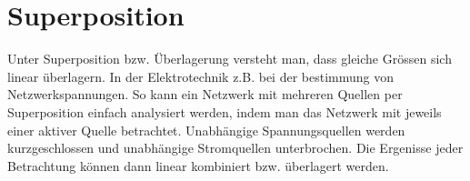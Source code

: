



\section{Superposition}
\label{sec:superpos}
Unter Superposition bzw. Überlagerung versteht man, dass gleiche Grössen sich linear überlagern.
In der Elektrotechnik z.B. bei der bestimmung von Netzwerkspannungen. 
So kann ein Netzwerk mit mehreren Quellen per Superposition einfach analysiert werden, indem man das Netzwerk mit jeweils einer aktiver Quelle betrachtet. 
Unabhängige Spannungsquellen werden kurzgeschlossen und unabhängige Stromquellen unterbrochen.
Die Ergenisse jeder Betrachtung können dann linear kombiniert bzw. überlagert werden.
